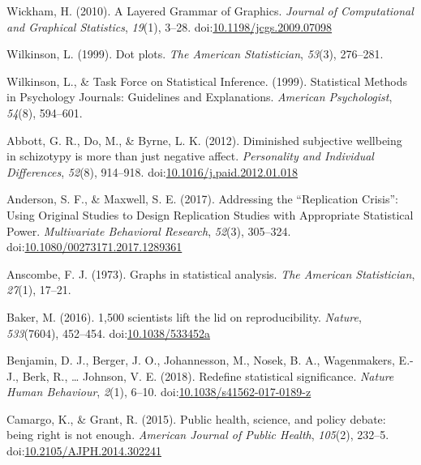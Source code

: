\documentclass[
  doc]{apa6}
\begin{document}
\leavevmode\hypertarget{ref-Wickham2010}{}%
Wickham, H. (2010). A Layered Grammar of Graphics. \emph{Journal of Computational and Graphical Statistics}, \emph{19}(1), 3--28. doi:\href{https://doi.org/10.1198/jcgs.2009.07098}{10.1198/jcgs.2009.07098}

\leavevmode\hypertarget{ref-Wilkinson1999}{}%
Wilkinson, L. (1999). Dot plots. \emph{The American Statistician}, \emph{53}(3), 276--281.

\leavevmode\hypertarget{ref-Wilkinson1999a}{}%
Wilkinson, L., \& Task Force on Statistical Inference. (1999). Statistical Methods in Psychology Journals: Guidelines and Explanations. \emph{American Psychologist}, \emph{54}(8), 594--601.

\leavevmode\hypertarget{ref-Abbott2012}{}%
Abbott, G. R., Do, M., \& Byrne, L. K. (2012). Diminished subjective wellbeing in schizotypy is more than just negative affect. \emph{Personality and Individual Differences}, \emph{52}(8), 914--918. doi:\href{https://doi.org/10.1016/j.paid.2012.01.018}{10.1016/j.paid.2012.01.018}

\leavevmode\hypertarget{ref-Anderson2017}{}%
Anderson, S. F., \& Maxwell, S. E. (2017). Addressing the ``Replication Crisis'': Using Original Studies to Design Replication Studies with Appropriate Statistical Power. \emph{Multivariate Behavioral Research}, \emph{52}(3), 305--324. doi:\href{https://doi.org/10.1080/00273171.2017.1289361}{10.1080/00273171.2017.1289361}

\leavevmode\hypertarget{ref-anscombe1973graphs}{}%
Anscombe, F. J. (1973). Graphs in statistical analysis. \emph{The American Statistician}, \emph{27}(1), 17--21.

\leavevmode\hypertarget{ref-Baker2016a}{}%
Baker, M. (2016). 1,500 scientists lift the lid on reproducibility. \emph{Nature}, \emph{533}(7604), 452--454. doi:\href{https://doi.org/10.1038/533452a}{10.1038/533452a}

\leavevmode\hypertarget{ref-Benjamin2018}{}%
Benjamin, D. J., Berger, J. O., Johannesson, M., Nosek, B. A., Wagenmakers, E.-J., Berk, R., \ldots{} Johnson, V. E. (2018). Redefine statistical significance. \emph{Nature Human Behaviour}, \emph{2}(1), 6--10. doi:\href{https://doi.org/10.1038/s41562-017-0189-z}{10.1038/s41562-017-0189-z}

\leavevmode\hypertarget{ref-Camargo2015}{}%
Camargo, K., \& Grant, R. (2015). Public health, science, and policy debate: being right is not enough. \emph{American Journal of Public Health}, \emph{105}(2), 232--5. doi:\href{https://doi.org/10.2105/AJPH.2014.302241}{10.2105/AJPH.2014.302241}
\end{document}

